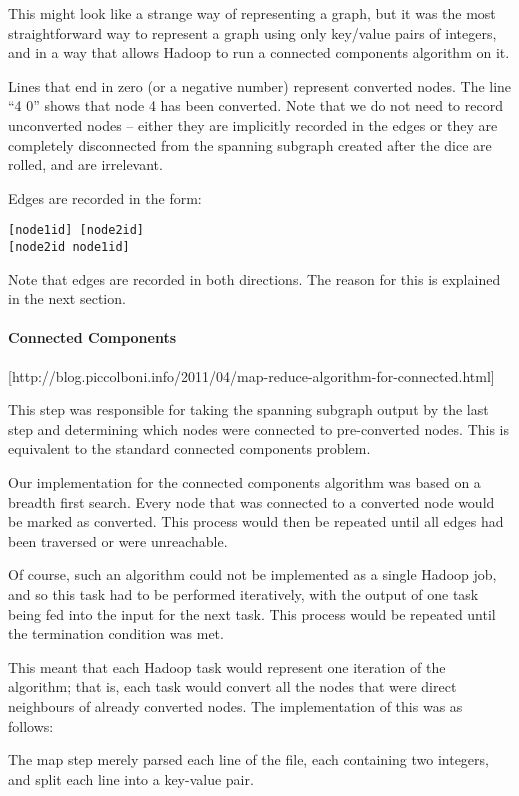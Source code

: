 This might look like a strange way of representing a graph, but it was the most straightforward way to represent a graph using only key/value pairs of integers, and in a way that allows Hadoop to run a connected components algorithm on it.

Lines that end in zero (or a negative number) represent converted nodes. The line ``4 0'' shows that node 4 has been converted. Note that we do not need to record unconverted nodes -- either they are implicitly recorded in the edges or they are completely disconnected from the spanning subgraph created after the dice are rolled, and are irrelevant.

Edges are recorded in the form:

\begin{verbatim}
[node1id] [node2id]
[node2id node1id]
\end{verbatim}

Note that edges are recorded in both directions. The reason for this is explained in the next section.

\paragraph{Connected Components}
[http://blog.piccolboni.info/2011/04/map-reduce-algorithm-for-connected.html]

This step was responsible for taking the spanning subgraph output by the last step and determining which nodes were connected to pre-converted nodes. This is equivalent to the standard connected components problem.

Our implementation for the connected components algorithm was based on a breadth first search. Every node that was connected to a converted node would be marked as converted. This process would then be repeated until all edges had been traversed or were unreachable.

Of course, such an algorithm could not be implemented as a single Hadoop job, and so this task had to be performed iteratively, with the output of one task being fed into the input for the next task. This process would be repeated until the termination condition was met.

This meant that each Hadoop task would represent one iteration of the algorithm; that is, each task would convert all the nodes that were direct neighbours of already converted nodes. The implementation of this was as follows:

The map step merely parsed each line of the file, each containing two integers, and split each line into a key-value pair.

